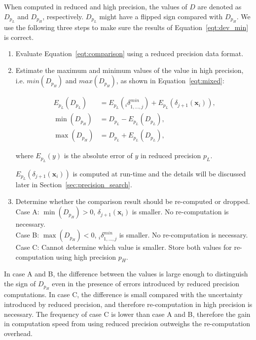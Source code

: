 When computed in reduced and high precision, the values of $D$ are denoted as $D_{p_L}$ and $D_{p_H}$, respectively.
$D_{p_L}$ might have a flipped sign compared with $D_{p_H}$.
We use the following three steps to make sure the results of Equation~\ref{eqt:dev_min} is correct.

\begin{enumerate}
\item Evaluate Equation~\ref{eqt:comparison} using a reduced precision data format. 
\item Estimate the maximum and minimum values of the value in high precision, i.e. $min(D_{p_H})$ and $max(D_{p_H})$, as shown in Equation~\ref{eqt:mixed}:

\begin{equation}
\begin{aligned}
E_{p_L}(D_{p_L}) &= E_{p_L}({_i\delta}^{min}_{1,...,j}) + E_{p_L}(\delta_{j+1}(\boldsymbol{x}_i)) \mbox{,} \\
\min{(D_{p_H})} &= D_{p_L} - E_{p_L}(D_{p_L}) \mbox{,} \\
\max{(D_{p_H})} &= D_{p_L} + E_{p_L}(D_{p_L}) \mbox{,}
\end{aligned}
\label{eqt:mixed}
\end{equation}

where $E_{p_L}(y)$ is the absolute error of $y$ in reduced precision $p_L$.

$E_{p_L}(\delta_{j+1}(\boldsymbol{x}_i))$ is computed at run-time and the details will be discussed later in Section~\ref{sec:precision_search}.

\item Determine whether the comparison result should be re-computed or dropped. \\
Case A: $\min{(D_{p_H})}>0$, $\delta_{j+1}(\boldsymbol{x}_i)$ is smaller. No re-computation is necessary. \\
Case B: $\max{(D_{p_H})}<0$, ${_i\delta}^{min}_{1,...,j}$ is smaller. No re-computation is necessary. \\
Case C: Cannot determine which value is smaller. Store both values for re-computation using high precision $p_H$.
\end{enumerate}

In case A and B, the difference between the values is large enough to distinguish the sign of $D_{p_H}$ even in the presence of errors introduced by reduced precision computations.
In case C, the difference is small compared with the uncertainty introduced by reduced precision, and therefore re-computation in high precision is necessary.
The frequency of case C is lower than case A and B, therefore the gain in computation speed from using reduced precision outweighs the re-computation overhead.

